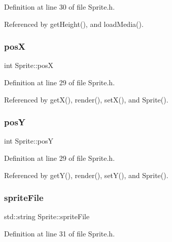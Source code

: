 Definition at line 30 of file Sprite.\+h.



Referenced by get\+Height(), and load\+Media().

\mbox{\label{class_sprite_a0af496e3e6540f1f1321913a741a737a}} 
\subsubsection{\texorpdfstring{posX}{posX}}
{\footnotesize\ttfamily int Sprite\+::posX\hspace{0.3cm}{\ttfamily [private]}}



Definition at line 29 of file Sprite.\+h.



Referenced by get\+X(), render(), set\+X(), and Sprite().

\mbox{\label{class_sprite_a1ef80a5eff9d5b0bb90ae355daf09efe}} 
\subsubsection{\texorpdfstring{posY}{posY}}
{\footnotesize\ttfamily int Sprite\+::posY\hspace{0.3cm}{\ttfamily [private]}}



Definition at line 29 of file Sprite.\+h.



Referenced by get\+Y(), render(), set\+Y(), and Sprite().

\mbox{\label{class_sprite_a595ffe434aadbc94b9abd272c0356c9d}} 
\subsubsection{\texorpdfstring{sprite\+File}{spriteFile}}
{\footnotesize\ttfamily std\+::string Sprite\+::sprite\+File\hspace{0.3cm}{\ttfamily [private]}}



Definition at line 31 of file Sprite.\+h.




